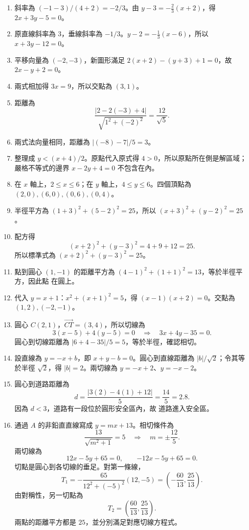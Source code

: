 \documentclass[11pt,a4paper]{article}
\providecommand{\tightlist}{%
  \setlength{\itemsep}{0pt}\setlength{\parskip}{0pt}}
\begin{document}
\begin{enumerate}
\def\labelenumi{\arabic{enumi}.}
\tightlist
\item
  斜率為 \((-1-3)/(4+2)=-2/3\)。由 \(y-3=-\frac23(x+2)\)，得 \(\boxed{2x+3y-5=0}\)。
\item
  原直線斜率為 \(3\)，垂線斜率為 \(-1/3\)。\(y-2=-\frac13(x-6)\)，所以 \(\boxed{x+3y-12=0}\)。
\item
  平移向量為 \((-2,-3)\)，新圖形滿足 \(2(x+2)-(y+3)+1=0\)，故 \(\boxed{2x-y+2=0}\)。
\item
  兩式相加得 \(3x=9\)，所以交點為 \(\boxed{(3,1)}\)。
\item
  距離為
  \[
  \frac{|2-2(-3)+4|}{\sqrt{1^2+(-2)^2}}
  =\boxed{\frac{12}{\sqrt5}}.
  \]
\item
  兩式法向量相同，距離為 \(|(-8)-7|/5=\boxed3\)。
\item
  整理成 \(y<(x+4)/2\)。原點代入原式得 \(4>0\)，所以原點所在側是解區域；嚴格不等式的邊界 \(x-2y+4=0\) 不包含在內。
\item
  在 \(x\) 軸上，\(2\le x\le6\)；在 \(y\) 軸上，\(4\le y\le6\)。四個頂點為 \(\boxed{(2,0),(6,0),(0,6),(0,4)}\)。
\item
  半徑平方為 \((1+3)^2+(5-2)^2=25\)，所以 \(\boxed{(x+3)^2+(y-2)^2=25}\)。
\item
  配方得
  \[
  (x+2)^2+(y-3)^2=4+9+12=25.
  \]
  所以標準式為 \(\boxed{(x+2)^2+(y-3)^2=25}\)。
\item
  點到圓心 \((1,-1)\) 的距離平方為 \((4-1)^2+(1+1)^2=13\)，等於半徑平方，因此點 \(\boxed{\text{在圓上}}\)。
\item
  代入 \(y=x+1\)：\(x^2+(x+1)^2=5\)，得 \((x-1)(x+2)=0\)。交點為 \(\boxed{(1,2),(-2,-1)}\)。
\item
  圓心 \(C(2,1)\)，\(\overrightarrow{CT}=(3,4)\)，所以切線為
  \[
  3(x-5)+4(y-5)=0
  \quad\Longrightarrow\quad
  \boxed{3x+4y-35=0}.
  \]
  圓心到切線距離為 \(|6+4-35|/5=5\)，等於半徑，確認相切。
\item
  設直線為 \(y=-x+b\)，即 \(x+y-b=0\)。圓心到直線距離為 \(|b|/\sqrt2\)；令其等於半徑 \(\sqrt2\)，得 \(|b|=2\)。兩切線為 \(\boxed{y=-x+2}\)、\(\boxed{y=-x-2}\)。
\item
  圓心到道路距離為
  \[
  d=\frac{|3(2)-4(1)+12|}{5}=\frac{14}{5}=2.8.
  \]
  因為 \(d<3\)，道路有一段位於圓形安全區內，故 \(\boxed{\text{道路進入安全區}}\)。
\item
  通過 \(A\) 的非鉛直直線寫成 \(y=mx+13\)。相切條件為
  \[
  \frac{13}{\sqrt{m^2+1}}=5
  \quad\Longrightarrow\quad
  m=\pm\frac{12}{5}.
  \]
  兩切線為
  \[
  \boxed{12x-5y+65=0},\qquad
  \boxed{-12x-5y+65=0}.
  \]
  切點是圓心到各切線的垂足。對第一條線，
  \[
  T_1=-\frac{65}{12^2+(-5)^2}(12,-5)
  =\left(-\frac{60}{13},\frac{25}{13}\right).
  \]
  由對稱性，另一切點為
  \[
  \boxed{T_2=\left(\frac{60}{13},\frac{25}{13}\right)}.
  \]
  兩點的距離平方都是 \(25\)，並分別滿足對應切線方程式。
\end{enumerate}
\end{document}
